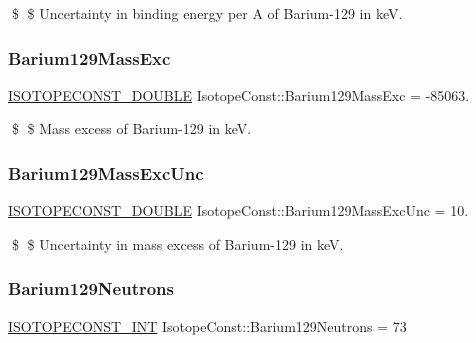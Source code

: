 \$ \$ Uncertainty in binding energy per A of Barium-\/129 in keV. \mbox{\label{group___isotope_const-_barium-_ba129_ga3674a3a51a68f7717b92707d5f637de1}} 
\subsubsection{\texorpdfstring{Barium129\+Mass\+Exc}{Barium129MassExc}}
{\footnotesize\ttfamily \mbox{\hyperlink{group___isotope_const-_macros_ga8f45a7272ce02c0b4c65c44636ed719a}{I\+S\+O\+T\+O\+P\+E\+C\+O\+N\+S\+T\+\_\+\+D\+O\+U\+B\+LE}} Isotope\+Const\+::\+Barium129\+Mass\+Exc = -\/85063.}

\$ \$ Mass excess of Barium-\/129 in keV. \mbox{\label{group___isotope_const-_barium-_ba129_gae778c534722a66a1ecf60815b785c733}} 
\subsubsection{\texorpdfstring{Barium129\+Mass\+Exc\+Unc}{Barium129MassExcUnc}}
{\footnotesize\ttfamily \mbox{\hyperlink{group___isotope_const-_macros_ga8f45a7272ce02c0b4c65c44636ed719a}{I\+S\+O\+T\+O\+P\+E\+C\+O\+N\+S\+T\+\_\+\+D\+O\+U\+B\+LE}} Isotope\+Const\+::\+Barium129\+Mass\+Exc\+Unc = 10.}

\$ \$ Uncertainty in mass excess of Barium-\/129 in keV. \mbox{\label{group___isotope_const-_barium-_ba129_gae15519909cb4c568e0daea8c1bcedefb}} 
\subsubsection{\texorpdfstring{Barium129\+Neutrons}{Barium129Neutrons}}
{\footnotesize\ttfamily \mbox{\hyperlink{group___isotope_const-_macros_ga5f18360b3e99483a35c32d789e62621c}{I\+S\+O\+T\+O\+P\+E\+C\+O\+N\+S\+T\+\_\+\+I\+NT}} Isotope\+Const\+::\+Barium129\+Neutrons = 73}

